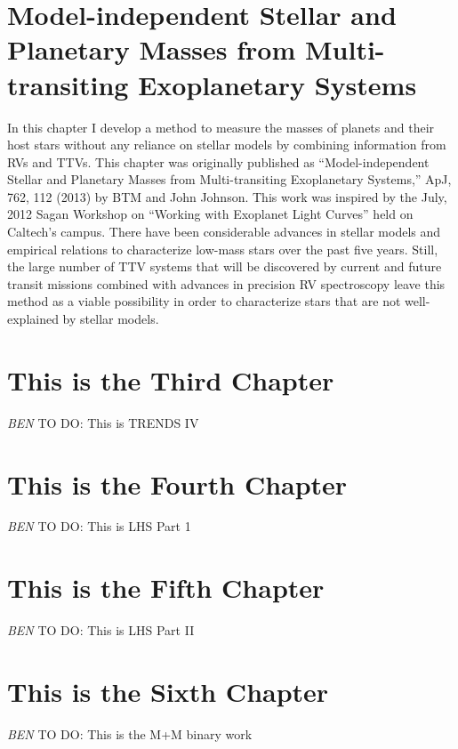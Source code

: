 \documentclass[12pt]{caltech_thesis}
\newcommand{\todo}[3]{{\color{#2} \emph{#1} TO DO: #3}}
\newcommand{\btmtodo}[1]{\todo{BEN}{red}{#1}}
\begin{document}
\chapter{Model-independent Stellar and Planetary Masses from Multi-transiting Exoplanetary Systems}
\label{chap:ttvs}

In this chapter I develop a method to measure the masses of planets and their host stars
without any reliance on stellar models by combining information from RVs and TTVs. 
This chapter was originally published as ``Model-independent Stellar and Planetary Masses from Multi-transiting Exoplanetary Systems,'' ApJ, 762, 112 (2013) by BTM and 
John Johnson. This work was inspired by the July, 2012 Sagan Workshop on ``Working with
Exoplanet Light Curves'' held on Caltech's campus.
There have been considerable advances in stellar models and
empirical relations to characterize low-mass stars over the past five years.
Still,
the large number of TTV systems that will be discovered by current and future transit
missions combined with advances in precision RV spectroscopy leave this method as a viable
possibility in order to characterize stars that are not well-explained by stellar models.






\chapter{This is the Third Chapter}
\label{chap:trends}


\btmtodo{This is TRENDS IV}

\chapter{This is the Fourth Chapter}
\label{chap:lhs1}

\btmtodo{This is LHS Part 1}
\chapter{This is the Fifth Chapter}

\btmtodo{This is LHS Part II}
\label{chap:lhsspitz}

\chapter{This is the Sixth Chapter}
\label{chap:Mbinaries}

\btmtodo{This is the M+M binary work}
\end{document}
